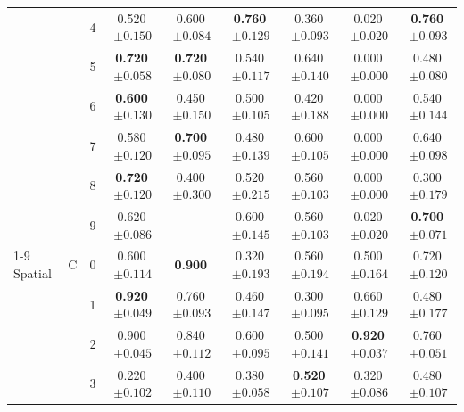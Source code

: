 \begin{longtable}{lllcccccc}
 &  & 4 & 0.520$\,{\scriptstyle\pm0.150}$ & 0.600$\,{\scriptstyle\pm0.084}$ & \textbf{0.760}$\,{\scriptstyle\pm0.129}$ & 0.360$\,{\scriptstyle\pm0.093}$ & 0.020$\,{\scriptstyle\pm0.020}$ & \textbf{0.760}$\,{\scriptstyle\pm0.093}$ \\
 &  & 5 & \textbf{0.720}$\,{\scriptstyle\pm0.058}$ & \textbf{0.720}$\,{\scriptstyle\pm0.080}$ & 0.540$\,{\scriptstyle\pm0.117}$ & 0.640$\,{\scriptstyle\pm0.140}$ & 0.000$\,{\scriptstyle\pm0.000}$ & 0.480$\,{\scriptstyle\pm0.080}$ \\
 &  & 6 & \textbf{0.600}$\,{\scriptstyle\pm0.130}$ & 0.450$\,{\scriptstyle\pm0.150}$ & 0.500$\,{\scriptstyle\pm0.105}$ & 0.420$\,{\scriptstyle\pm0.188}$ & 0.000$\,{\scriptstyle\pm0.000}$ & 0.540$\,{\scriptstyle\pm0.144}$ \\
 &  & 7 & 0.580$\,{\scriptstyle\pm0.120}$ & \textbf{0.700}$\,{\scriptstyle\pm0.095}$ & 0.480$\,{\scriptstyle\pm0.139}$ & 0.600$\,{\scriptstyle\pm0.105}$ & 0.000$\,{\scriptstyle\pm0.000}$ & 0.640$\,{\scriptstyle\pm0.098}$ \\
 &  & 8 & \textbf{0.720}$\,{\scriptstyle\pm0.120}$ & 0.400$\,{\scriptstyle\pm0.300}$ & 0.520$\,{\scriptstyle\pm0.215}$ & 0.560$\,{\scriptstyle\pm0.103}$ & 0.000$\,{\scriptstyle\pm0.000}$ & 0.300$\,{\scriptstyle\pm0.179}$ \\
 &  & 9 & 0.620$\,{\scriptstyle\pm0.086}$ & --- & 0.600$\,{\scriptstyle\pm0.145}$ & 0.560$\,{\scriptstyle\pm0.103}$ & 0.020$\,{\scriptstyle\pm0.020}$ & \textbf{0.700}$\,{\scriptstyle\pm0.071}$ \\
\cmidrule(lr){1-9}
Spatial & C & 0 & 0.600$\,{\scriptstyle\pm0.114}$ & \textbf{0.900} & 0.320$\,{\scriptstyle\pm0.193}$ & 0.560$\,{\scriptstyle\pm0.194}$ & 0.500$\,{\scriptstyle\pm0.164}$ & 0.720$\,{\scriptstyle\pm0.120}$ \\
 &  & 1 & \textbf{0.920}$\,{\scriptstyle\pm0.049}$ & 0.760$\,{\scriptstyle\pm0.093}$ & 0.460$\,{\scriptstyle\pm0.147}$ & 0.300$\,{\scriptstyle\pm0.095}$ & 0.660$\,{\scriptstyle\pm0.129}$ & 0.480$\,{\scriptstyle\pm0.177}$ \\
 &  & 2 & 0.900$\,{\scriptstyle\pm0.045}$ & 0.840$\,{\scriptstyle\pm0.112}$ & 0.600$\,{\scriptstyle\pm0.095}$ & 0.500$\,{\scriptstyle\pm0.141}$ & \textbf{0.920}$\,{\scriptstyle\pm0.037}$ & 0.760$\,{\scriptstyle\pm0.051}$ \\
 &  & 3 & 0.220$\,{\scriptstyle\pm0.102}$ & 0.400$\,{\scriptstyle\pm0.110}$ & 0.380$\,{\scriptstyle\pm0.058}$ & \textbf{0.520}$\,{\scriptstyle\pm0.107}$ & 0.320$\,{\scriptstyle\pm0.086}$ & 0.480$\,{\scriptstyle\pm0.107}$ \\

\end{longtable}
